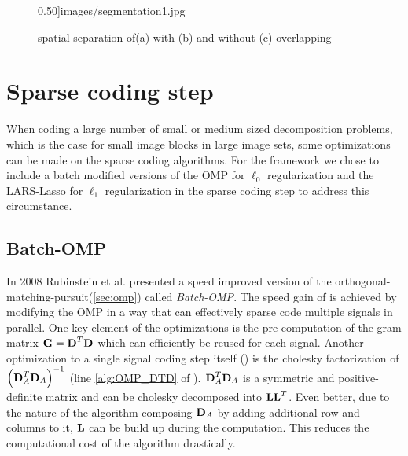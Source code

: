 \begin{figure}[h]
{0.50]{images/segmentation1.jpg}}
\hspace{5mm}
\caption[spatial separation]{spatial separation of(a) with (b) and without (c)
overlapping}
\label{fig:separation}
\end{figure}

\section{Sparse coding step}
When coding a large number of small or medium sized decomposition problems,
which is the case for small image blocks in large image sets, some
optimizations can be made on the sparse coding algorithms. 
For the framework we chose to include a batch modified versions of the OMP for
$\ell_0$ regularization and the LARS-Lasso for $\ell_1$ regularization in the
sparse coding step to address this circumstance. 

\subsection{Batch-OMP}
In 2008 Rubinstein et al.\cite{Rubinstein2008} presented a speed improved
version of the orthogonal-matching-pursuit(\ref{sec:omp}) called
\emph{Batch-OMP}. The speed gain of  is achieved
by modifying the OMP in a way that can effectively sparse code
multiple signals in parallel. One key element of the optimizations is the
pre-computation of the gram matrix $\boldsymbol{\mathrm{G}}=\boldsymbol{\mathrm{D}}^T\boldsymbol{\mathrm{D}}$ which can
efficiently be reused for each signal. Another optimization to a single signal
coding step itself () is the cholesky factorization of
$\left( \boldsymbol{\mathrm{D}}_A^T \boldsymbol{\mathrm{D}}_A \right)^{-1}$ (line \ref{alg:OMP_DTD} of
). $\boldsymbol{\mathrm{D}}_A^T \boldsymbol{\mathrm{D}}_A$ is a symmetric and
positive-definite matrix and can be cholesky decomposed
into $\boldsymbol{\mathrm{L}}\boldsymbol{\mathrm{L}}^T$. Even better, due to the nature of the algorithm
composing $\boldsymbol{\mathrm{D}}_A$ by adding additional row and columns to it, $\boldsymbol{\mathrm{L}}$ can
be build up during the computation. This reduces the computational cost of the
algorithm drastically.

